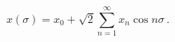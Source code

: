 \begin{equation}
x (\sigma) = x_0 + \sqrt{2} \sum_{n = 1}^{ \infty}  x_n \cos n \sigma\,.
\end{equation}

